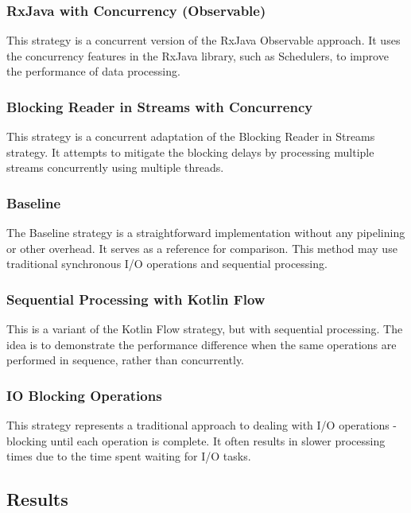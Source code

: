 \subsubsection{RxJava with Concurrency (Observable)}
\label{subsubsec:rxjava_concurrency_observable}
This strategy is a concurrent version of the RxJava Observable approach. It uses the concurrency features in the RxJava library, such as Schedulers, to improve the performance of data processing.

\subsubsection{Blocking Reader in Streams with Concurrency}
\label{subsubsec:blocking_reader_streams_concurrency}
This strategy is a concurrent adaptation of the Blocking Reader in Streams strategy. It attempts to mitigate the blocking delays by processing multiple streams concurrently using multiple threads.

\subsubsection{Baseline}
\label{subsubsec:baseline}
The Baseline strategy is a straightforward implementation without any pipelining or other overhead. It serves as a reference for comparison. This method may use traditional synchronous I/O operations and sequential processing.

\subsubsection{Sequential Processing with Kotlin Flow}
\label{subsubsec:sequential_processing_kotlin_flow}
This is a variant of the Kotlin Flow strategy, but with sequential processing. The idea is to demonstrate the performance difference when the same operations are performed in sequence, rather than concurrently.

\subsubsection{IO Blocking Operations}
\label{subsubsec:io_blocking_operations}
This strategy represents a traditional approach to dealing with I/O operations - blocking until each operation is complete. It often results in slower processing times due to the time spent waiting for I/O tasks.


\subsection{Results}
\label{subsubsec:results}

